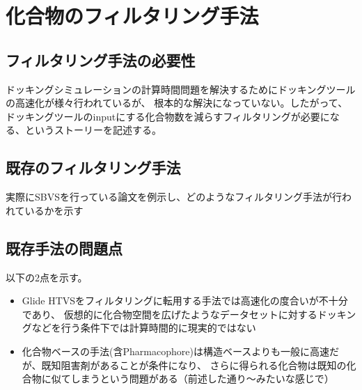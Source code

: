 \section{化合物のフィルタリング手法}

\subsection{フィルタリング手法の必要性}
ドッキングシミュレーションの計算時間問題を解決するためにドッキングツールの高速化が様々行われているが、
根本的な解決になっていない。したがって、ドッキングツールのinputにする化合物数を減らすフィルタリングが必要になる、というストーリーを記述する。
\subsection{既存のフィルタリング手法}
実際にSBVSを行っている論文を例示し、どのようなフィルタリング手法が行われているかを示す
\subsection{既存手法の問題点}
以下の2点を示す。
\begin{itemize}
\item Glide HTVSをフィルタリングに転用する手法では高速化の度合いが不十分であり、
	仮想的に化合物空間を広げたようなデータセットに対するドッキングなどを行う条件下では計算時間的に現実的ではない
\item 化合物ベースの手法(含Pharmacophore)は構造ベースよりも一般に高速だが、既知阻害剤があることが条件になり、
	さらに得られる化合物は既知の化合物に似てしまうという問題がある（前述した通り～みたいな感じで）
\end{itemize}

%
%
